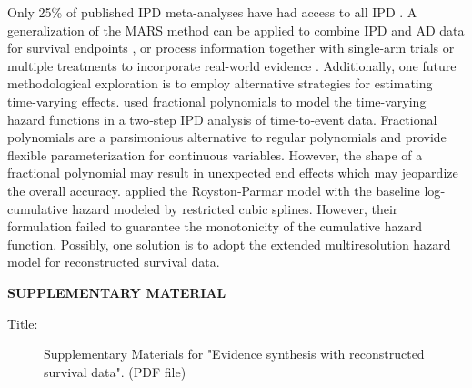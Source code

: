 \documentclass[12pt]{article}
\theoremstyle{mystyle}
\begin{document}
Only 25\% of published IPD meta-analyses have had access to all IPD \citep{Nevitt2017}.  A generalization of the MARS method can be applied to combine IPD and AD data for survival endpoints \citep{riley2007evidence}, or process information together with single-arm trials or multiple treatments to incorporate real-world evidence \citep{begg1991model, zhang2019bayesian}. Additionally, one future methodological exploration is to employ alternative strategies for estimating time-varying effects. \cite{Jansen2011, Jansen2012} used fractional polynomials \citep{Royston1994} to model the time-varying hazard functions in a two‐step IPD analysis of time‐to‐event data.  Fractional polynomials are a parsimonious alternative to regular polynomials and provide flexible parameterization for continuous variables.  However, the shape of a fractional polynomial may result in unexpected end effects which may jeopardize the overall accuracy. \cite{Freeman2017} applied the Royston‐Parmar model with the baseline log‐cumulative hazard modeled by restricted cubic splines.  However, their formulation failed to guarantee the monotonicity of the cumulative hazard function.  Possibly, one solution is to adopt the extended multiresolution hazard model \citep{Hagar2017} for reconstructed survival data.   





\vspace{35pt}
\begin{center}
{\large\bf SUPPLEMENTARY MATERIAL}
\end{center}

\begin{description}

\item[Title:] Supplementary Materials for "Evidence synthesis with reconstructed survival data". (PDF file)

\end{description}

\newpage
%

\end{document}
